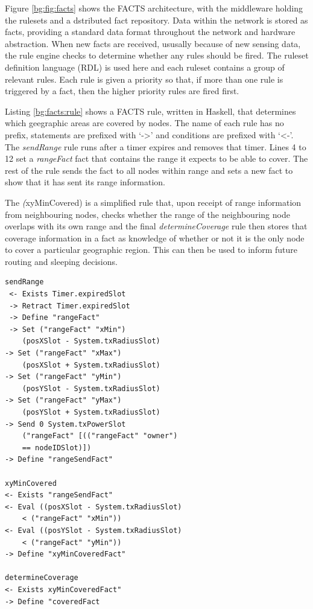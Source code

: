 		Figure \ref{bg:fig:facts} shows the FACTS architecture, with the middleware holding the rulesets and a dstributed fact repository. Data within the network is stored as facts, providing a standard data format throughout the network and hardware abstraction. When new facts are received, ususally because of new sensing data, the rule engine checks to determine whether any rules should be fired. The ruleset definition language (RDL) is used here and each ruleset contains a group of relevant rules. Each rule is given a priority so that, if more than one rule is triggered by a fact, then the higher priority rules are fired first.

		Listing \ref{bg:facts:rule} shows a FACTS rule, written in Haskell, that determines which geegraphic areas are covered by nodes. The name of each rule has no prefix, statements are prefixed with `->' and conditions are prefixed with `<-'. The \textit{sendRange} rule runs after a timer expires and removes that timer. Lines 4 to 12 set a \textit{rangeFact} fact that contains the range it expects to be able to cover. The rest of the rule sends the fact to all nodes within range and sets a new fact to show that it has sent its range information. 

		The \textit(xyMinCovered) is a simplified rule that, upon receipt of range information from neighbouring nodes, checks whether the range of the neighbouring node overlaps with its own range and the final \textit{determineCoverage} rule then stores that coverage information in a fact as knowledge of whether or not it is the only node to cover a particular geographic region. This can then be used to inform future routing and sleeping decisions.

		\begin{lstlisting}[caption={Coverage Algorithm in FACTS Rules}, label={bg:facts:rule}]
 sendRange
 <- Exists Timer.expiredSlot
 -> Retract Timer.expiredSlot 
 -> Define "rangeFact"
 -> Set ("rangeFact" "xMin")
	(posXSlot - System.txRadiusSlot)
-> Set ("rangeFact" "xMax") 
	(posXSlot + System.txRadiusSlot)
-> Set ("rangeFact" "yMin")
	(posYSlot - System.txRadiusSlot)
-> Set ("rangeFact" "yMax")
	(posYSlot + System.txRadiusSlot)
-> Send 0 System.txPowerSlot 
	("rangeFact" [(("rangeFact" "owner")
	== nodeIDSlot)])
-> Define "rangeSendFact"

xyMinCovered
<- Exists "rangeSendFact"
<- Eval ((posXSlot - System.txRadiusSlot)
	< ("rangeFact" "xMin"))
<- Eval ((posYSlot - System.txRadiusSlot)
	< ("rangeFact" "yMin"))
-> Define "xyMinCoveredFact" 

determineCoverage
<- Exists xyMinCoveredFact"
-> Define "coveredFact
		\end{lstlisting}

